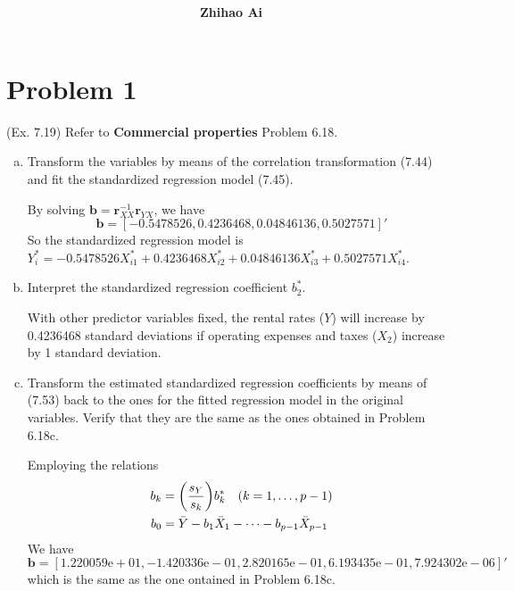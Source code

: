 \documentclass[10pt]{report}
\title{
	\vspace{2in}
	\textmd{\textbf{\hwCourse\\\hwTitle}}\\
	\vspace{0.3in}\large{\textit{\hmClassInstructor}}
	\vspace{3in}
}
\author{\textbf{Zhihao Ai}}
\date{}
\DeclarePairedDelimiter\autoparen{(}{)}
\newcommand{\pa}[1]{\autoparen*{#1}}
\newcommand{\m}[1] {\mathbf{#1}}
\begin{document}
\maketitle

\section*{Problem 1}
(Ex. 7.19) Refer to \textbf{Commercial properties}  Problem 6.18.
\begin{enumerate}[a.]
	\item 
	Transform the variables by means of the correlation transformation (7.44) and fit the standardized regression model (7.45).
	
	By solving $\m{b} = \m{r}^{-1}_{XX} \m{r}^{}_{YX}$, we have
	\[
	\m{b} = [-0.5478526, 0.4236468, 0.04846136, 0.5027571]'
	\]
	So the standardized regression model is $Y^*_i = -0.5478526 X^*_{i1} + 0.4236468 X^*_{i2} + 0.04846136 X^*_{i3} + 0.5027571 X^*_{i4}$.
	
	\item 
	Interpret the standardized regression coefficient $b^*_2$.
	
	With other predictor variables fixed, the rental rates ($Y$) will increase by 0.4236468 standard deviations if operating expenses and taxes ($X_2$) increase by 1 standard deviation.
	
	\item 
	Transform the estimated standardized regression coefficients by means of (7.53) back to the ones for the fitted regression model in the original variables. Verify that they are the same as the ones obtained in Problem 6.18c.
	
	Employing the relations
	\begin{align*}
		b_k &= \pa{\frac{s_Y}{s_k}} b^*_k \quad (k=1,\dots,p-1)\\
		b_0 &= \bar{Y} - b_1 \bar{X}_1 - \dots - b_{p-1} \bar{X}_{p-1}
	\end{align*}
	We have
	\[
	\m{b} = [1.220059\mathrm{e}+01, -1.420336\mathrm{e}-01, 2.820165\mathrm{e}-01, 6.193435\mathrm{e}-01, 7.924302\mathrm{e}-06]'
	\]
	which is the same as the one ontained in Problem 6.18c.
\end{enumerate}
\end{document}
